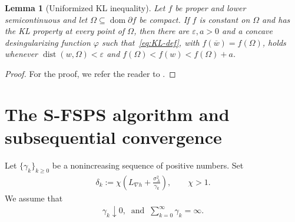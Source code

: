 \documentclass[9pt]{article}
\numberwithin{equation}{section}
\newtheorem{lemma}[theorem]{Lemma}
\theoremstyle{definition}
\theoremstyle{remark}
\DeclareMathOperator{\dist}{dist}
\DeclareMathOperator{\dom}{dom}
\begin{document}
\begin{lemma}[Uniformized KL inequality]\label{lem:uniform-KL}
Let $f$ be proper and lower semicontinuous and let
$\Omega\subseteq\dom\partial f$ be compact. If $f$ is constant on
$\Omega$ and has the KL property at every point of $\Omega$, then
there are $\varepsilon,a>0$ and a concave desingularizing function
$\varphi$ such that~\eqref{eq:KL-def}, with $f(\overline w)=f(\Omega)$,
holds whenever $\dist(w,\Omega)<\varepsilon$ and
$f(\Omega)<f(w)<f(\Omega)+a$.
\end{lemma}
\begin{proof}
For the proof, we refer the reader to \cite[Lemma~6]{BolteSabachTeboulle2014}.
\end{proof}


\section{The S-FSPS algorithm and subsequential convergence}\label{sec:algorithm}
Let $\{\gamma_k\}_{k\geq0}$ be a nonincreasing sequence of positive numbers. Set
\begin{eqnarray}\label{eq:delta}
 \delta_k:=\chi\left(L_{\nabla h}+\frac{\sigma_A^2}{\gamma_k}\right),
 \qquad \chi>1.
\end{eqnarray}
We assume that
\begin{eqnarray}\label{eq:gamma-basic}
 \gamma_k\downarrow0,\;\;\mbox{and}\;\; \sum_{k=0}^{\infty}\gamma_k=\infty.
\end{eqnarray}
\end{document}
